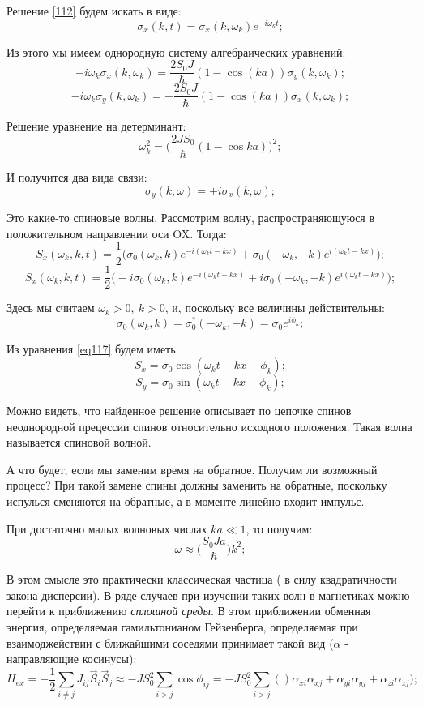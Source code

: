 \documentclass[a4paper, 14pt, russian]{article}
\newcommand{\be}{\begin{equation}}
\newcommand{\ee}{\end{equation}}
\begin{document}
	Решение \ref{112} будем искать в  виде:
	\be
		\label{eq113}
		\sigma_x(k,t) = \sigma_x(k,\omega_k) e^{-i \omega_k t};
	\ee

	Из этого мы имеем однородную систему алгебраических уравнений:
	\be
		\label{eq114}
		- i \omega_k {\sigma}_x (k,\omega_k) = \frac{2S_0 J}{\hbar} (1 - \cos(ka)) \sigma_y(k,\omega_k);
	\ee
	\be
		- i \omega_k {\sigma}_y (k,\omega_k) =  - \frac{2S_0 J}{\hbar} (1 - \cos(ka)) \sigma_x(k,\omega_k);
	\ee

	Решение уравнение на детерминант:
	\be
		\label{eq115}
		\omega_k^2 = \big(\frac{2JS_0}{\hbar} (1 - \cos ka)\big)^2;
	\ee

	И получится два вида связи:
	\be
		\label{eq116}
		\sigma_y(k, \omega) = \pm i \sigma_x(k,\omega);
	\ee

	Это какие-то спиновые волны. Рассмотрим волну, распространяющуюся в
	положительном направлении оси OX. Тогда:
	\be
		\label{eq117}
		S_x(\omega_k, k, t) = \frac{1}{2} \big(\sigma_0 (\omega_k, k) 
			e^{-i(\omega_k t - kx)} + \sigma_0 (-\omega_k, -k) 
			e^{i(\omega_k t - kx)}\big);
	\ee
	\be
		S_x(\omega_k, k, t) = \frac{1}{2} \big(-i\sigma_0 (\omega_k, k) 
			e^{-i(\omega_k t - kx)} + i \sigma_0 (-\omega_k, -k) 
			e^{i(\omega_k t - kx)}\big);
	\ee

	Здесь мы считаем $\omega_k > 0,~k > 0$, и, поскольку
	все величины действительны:
	\be
		\sigma_0(\omega_k, k) = \sigma_0^{*}(-\omega_k, -k) = \sigma_0 e^{i\phi_k};
	\ee

	Из уравнения \ref{eq117} будем иметь:
	\be
		\label{eq118}
		S_x = \sigma_0 \cos(\omega_k t - kx - \phi_k);
	\ee
	\be
		S_y = \sigma_0 \sin(\omega_k t - kx - \phi_k);
	\ee

	Можно видеть, что найденное решение описывает по цепочке
	спинов неоднородной прецессии спинов относительно 
	исходного положения. Такая волна называется спиновой волной.

	А что будет, если мы заменим время на обратное. Получим ли возможный
	процесс? При такой замене спины должны заменить на обратные, поскольку 
	испулься сменяются на обратные, а в моменте линейно входит импульс.

	При достаточно малых волновых числах $ka \ll 1$, то получим:
	\be
		\label{eq119}
		\omega \approx \big(\frac{S_0 J a}{\hbar}\big) k^2; 
	\ee

	В этом смысле это практически классическая частица ( в силу квадратичности закона дисперсии).
	В ряде случаев при изучении таких волн в магнетиках можно перейти к приближению
	\textit{сплошной среды}. В этом приближении обменная энергия, определяемая гамильтонианом
	Гейзенберга, определяемая при взаимоджействии с ближайшими соседями принимает такой вид 
	($\alpha$ - направляющие косинусы):
	\be
		H_{ex} = - \frac{1}{2} \sum_{i \neq j} J_{ij} \vec{S}_i \vec{S}_j \approx
			- J S_0^2 \sum_{i > j} \cos \phi_{ij} = - J S_0^2 \sum_{i > j}
			()\alpha_{xi} \alpha_{xj} + \alpha_{yi} \alpha_{yj} + \alpha_{zi} \alpha_{zj});
	\ee
\end{document}
